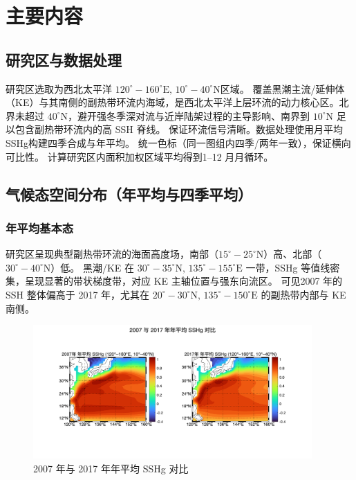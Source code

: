 \documentclass[UTF8]{article}
\begin{document}
\section{主要内容}
\subsection{研究区与数据处理}
研究区选取为西北太平洋 $120^\circ\!-\!160^\circ\mathrm{E},\,10^\circ\!-\!40^\circ\mathrm{N}$区域。
覆盖黑潮主流/延伸体（KE）与其南侧的副热带环流内海域，是西北太平洋上层环流的动力核心区。北界未超过 $40^\circ\mathrm{N}$，避开强冬季深对流与近岸陆架过程的主导影响、南界到 $10^\circ\mathrm{N}$ 足以包含副热带环流内的高 SSH 脊线。
保证环流信号清晰。数据处理使用月平均SSHg构建四季合成与年平均。
统一色标（同一图组内四季/两年一致），保证横向可比性。
计算研究区内面积加权区域平均得到1–12 月月循环。


\subsection{气候态空间分布（年平均与四季平均）}
\subsubsection{年平均基本态}
研究区呈现典型副热带环流的海面高度场，南部（$15^\circ\!-\!25^\circ\mathrm{N}$）高、北部（$30^\circ\!-\!40^\circ\mathrm{N}$）低。
黑潮/KE 在 $30^\circ\!-\!35^\circ\mathrm{N},\,135^\circ\!-\!155^\circ\mathrm{E}$ 一带，SSHg 等值线密集，呈现显著的带状梯度带，对应 KE 主轴位置与强东向流区。
可见2007 年的 SSH 整体偏高于 2017 年，尤其在 $20^\circ\!-\!30^\circ\mathrm{N},\,135^\circ\!-\!150^\circ\mathrm{E}$ 的副热带内部与 KE 南侧。

\begin{figure}[H]
    \centering
    \includegraphics[width=0.95\textwidth]{SSHg_Annual_2007vs2017.png}
    \caption{2007 年与 2017 年年平均 SSHg 对比}
    \label{fig:sshg_annual}
\end{figure}
\end{document}
